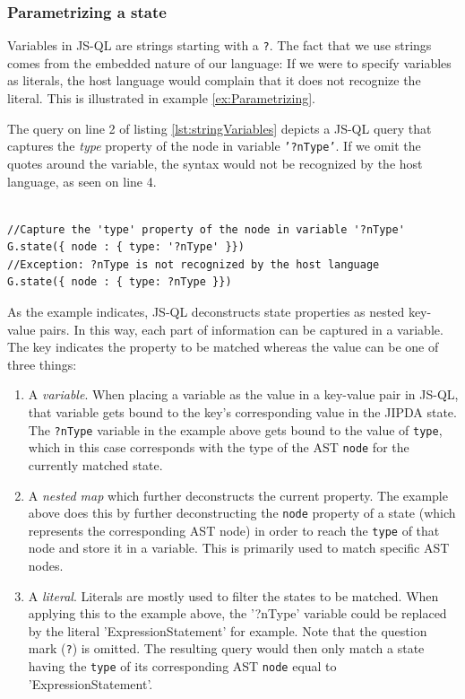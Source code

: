 \subsubsection*{Parametrizing a state}
 Variables in JS-QL are strings starting with a \texttt{?}. The fact that we use strings comes from the embedded nature of our language: If we were to specify variables as literals, the host language would complain that it does not recognize the literal. This is illustrated in example \ref{ex:Parametrizing}.

\begin{exmp}
\label{ex:Parametrizing}
The query on line 2 of listing \ref{lst:stringVariables} depicts a JS-QL query that captures the \textit{type} property of the node in variable \texttt{'?nType'}. If we omit the quotes around the variable, the syntax would not be recognized by the host language, as seen on line 4.

\begin{lstlisting}[label={lst:stringVariables},language=JSQL,caption=Defining variables in JS-QL,mathescape=true]  % float=t?

//Capture the 'type' property of the node in variable '?nType'
G.state({ node : { type: '?nType' }})
//Exception: ?nType is not recognized by the host language
G.state({ node : { type: ?nType }}) 
\end{lstlisting}

\end{exmp}

As the example indicates, JS-QL deconstructs state properties as nested key-value pairs. In this way, each part of information can be captured in a variable. The key indicates the property to be matched whereas the value can be one of three things:
\begin{enumerate}
\item A \textit{variable}. When placing a variable as the value in a key-value pair in JS-QL, that variable gets bound to the key's corresponding value in the JIPDA state. The \texttt{?nType} variable in the example above gets bound to the value of \texttt{type}, which in this case corresponds with the type of the AST \texttt{node} for the currently matched state.
\item A \textit{nested map} which further deconstructs the current property. The example above does this by further deconstructing the \texttt{node} property of a state (which represents the corresponding AST node) in order to reach the \texttt{type} of that node and store it in a variable. This is primarily used to match specific AST nodes.
\item A \textit{literal}. Literals are mostly used to filter the states to be matched. When applying this to the example above, the '?nType' variable could be replaced by the literal 'ExpressionStatement' for example. Note that the question mark (\texttt{?}) is omitted. The resulting query would then only match a state having the \texttt{type} of its corresponding AST \texttt{node} equal to 'ExpressionStatement'.
\end{enumerate}


